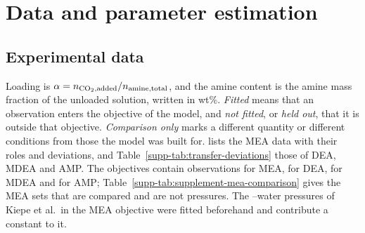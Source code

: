 \section{Data and parameter estimation}\label{sec:data-methods}
\subsection{Experimental data}\label{sec:data-roles}
Loading is $\alpha=n_{\COtwo,\mathrm{added}}/n_{\mathrm{amine,total}}$, and the amine content is the amine mass fraction of the unloaded solution, written in wt\%.
\emph{Fitted} means that an observation enters the objective of the model, and \emph{not fitted}, or \emph{held out}, that it is outside that objective.
\emph{Comparison only} marks a different quantity or different conditions from those the model was built for.
 lists the MEA data with their roles and deviations, and Table~\ref{supp-tab:transfer-deviations} those of DEA, MDEA and AMP.
The objectives contain  observations for MEA,  for DEA,  for MDEA and  for AMP; Table~\ref{supp-tab:supplement-mea-comparison} gives the MEA sets that are compared and are not pressures.
The  \COtwo--water pressures of Kiepe et al.\ in the MEA objective were fitted beforehand and contribute a constant to it.

